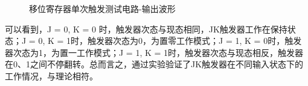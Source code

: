\documentclass[UTF8]{ctexart}
\numberwithin{figure}{subsection}
\numberwithin{table}{subsection}
\numberwithin{equation}{subsection}
\begin{document}
\begin{figure}[H]
    \centering
    
    \caption{移位寄存器单次触发测试电路-输出波形}
    \label{S-V2 osci}
\end{figure}

可以看到，J = 0, K = 0 时，触发器次态与现态相同，JK触发器工作在保持状态；J = 0, K = 1时，触发器次态为0，为置零工作模式；J = 1, K = 0时，触发器次态为1，为置一工作模式；J = 1, K = 1时，触发器次态与现态相反，触发器在0、1之间不停翻转。总而言之，通过实验验证了JK触发器在不同输入状态下的工作情况，与理论相符。
\end{document}
